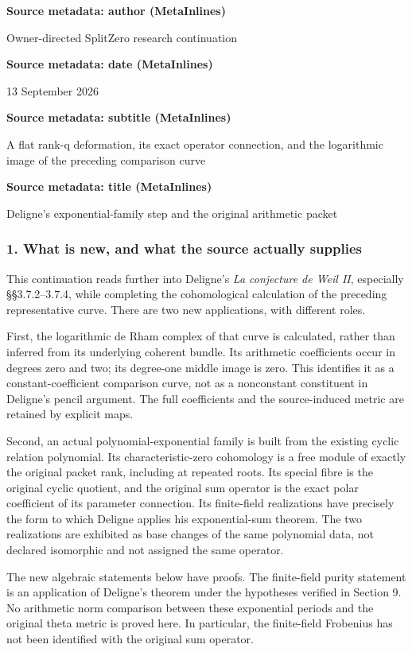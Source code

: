 \textbf{Source metadata: author (MetaInlines)}

Owner-directed SplitZero research continuation

\textbf{Source metadata: date (MetaInlines)}

13 September 2026

\textbf{Source metadata: subtitle (MetaInlines)}

A flat rank-q deformation, its exact operator connection, and the logarithmic image of the preceding comparison curve

\textbf{Source metadata: title (MetaInlines)}

Deligne's exponential-family step and the original arithmetic packet

\subsubsection{1. What is new, and what the source actually supplies}\label{endpoint-exponential_original--what-is-new-and-what-the-source-actually-supplies}

This continuation reads further into Deligne's \emph{La conjecture de Weil II}, especially §§3.7.2--3.7.4, while completing the cohomological calculation of the preceding representative curve. There are two new applications, with different roles.

First, the logarithmic de Rham complex of that curve is calculated, rather than inferred from its underlying coherent bundle. Its arithmetic coefficients occur in degrees zero and two; its degree-one middle image is zero. This identifies it as a constant-coefficient comparison curve, not as a nonconstant constituent in Deligne's pencil argument. The full coefficients and the source-induced metric are retained by explicit maps.

Second, an actual polynomial-exponential family is built from the existing cyclic relation polynomial. Its characteristic-zero cohomology is a free module of exactly the original packet rank, including at repeated roots. Its special fibre is the original cyclic quotient, and the original sum operator is the exact polar coefficient of its parameter connection. Its finite-field realizations have precisely the form to which Deligne applies his exponential-sum theorem. The two realizations are exhibited as base changes of the same polynomial data, not declared isomorphic and not assigned the same operator.

The new algebraic statements below have proofs. The finite-field purity statement is an application of Deligne's theorem under the hypotheses verified in Section 9. No arithmetic norm comparison between these exponential periods and the original theta metric is proved here. In particular, the finite-field Frobenius has not been identified with the original sum operator.

